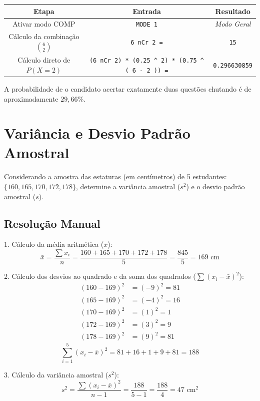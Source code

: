 \begin{table}[H]
    \centering
    \begin{tabular}{|c|c|c|}
        \hline
        \textbf{Etapa} & \textbf{Entrada} & \textbf{Resultado} \\ \hline
        Ativar modo COMP & \texttt{MODE 1} & \textit{Modo Geral} \\
        Cálculo da combinação $\binom{6}{2}$ & \texttt{6 nCr 2 =} & \texttt{15} \\
        Cálculo direto de $P(X=2)$ & \texttt{(6 nCr 2) * (0.25 \^{} 2) * (0.75 \^{} ( 6 - 2 )) =} & \texttt{0.296630859} \\ \hline
    \end{tabular}
\end{table}

A probabilidade de o candidato acertar exatamente duas questões chutando é de aproximadamente $29{,}66\%$.

\section{Variância e Desvio Padrão Amostral}

Considerando a amostra das estaturas (em centímetros) de 5 estudantes: $\{160, 165, 170, 172, 178\}$, determine a variância amostral ($s^2$) e o desvio padrão amostral ($s$).

\subsection*{Resolução Manual}

1. Cálculo da média aritmética ($\bar{x}$):
\[
\bar{x} = \frac{\sum x_i}{n} = \frac{160 + 165 + 170 + 172 + 178}{5} = \frac{845}{5} = 169 \text{ cm}
\]

2. Cálculo dos desvios ao quadrado e da soma dos quadrados ($\sum (x_i - \bar{x})^2$):
\begin{align*}
(160 - 169)^2 &= (-9)^2 = 81 \\
(165 - 169)^2 &= (-4)^2 = 16 \\
(170 - 169)^2 &= (1)^2 = 1 \\
(172 - 169)^2 &= (3)^2 = 9 \\
(178 - 169)^2 &= (9)^2 = 81
\end{align*}
\[
\sum_{i=1}^{5} (x_i - \bar{x})^2 = 81 + 16 + 1 + 9 + 81 = 188
\]

3. Cálculo da variância amostral ($s^2$):
\[
s^2 = \frac{\sum (x_i - \bar{x})^2}{n - 1} = \frac{188}{5 - 1} = \frac{188}{4} = 47 \text{ cm}^2
\]

